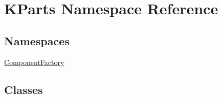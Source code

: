 \hypertarget{namespaceKParts}{\section{K\+Parts Namespace Reference}
\label{namespaceKParts}
}
\subsection*{Namespaces}
\begin{DoxyCompactItemize}
\item 
 \hyperlink{namespaceKParts_1_1ComponentFactory}{Component\+Factory}
\end{DoxyCompactItemize}
\subsection*{Classes}
